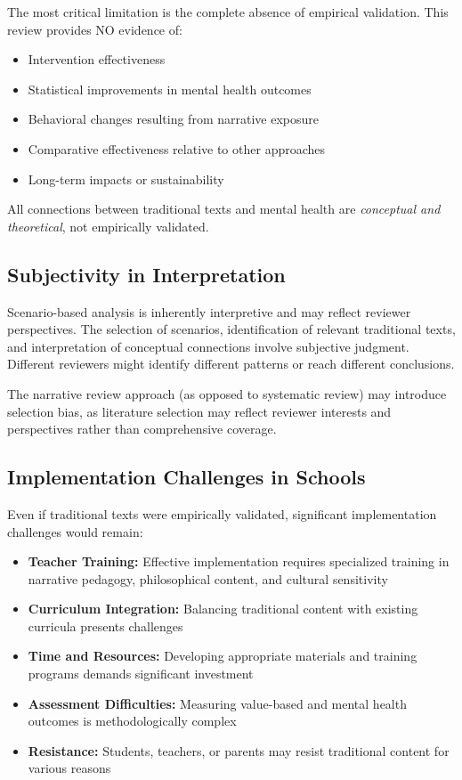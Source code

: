 \documentclass[12pt,a4paper,twocolumn]{article}
\begin{document}
The most critical limitation is the complete absence of empirical validation. This review provides NO evidence of:
\begin{itemize}
    \item Intervention effectiveness
    \item Statistical improvements in mental health outcomes
    \item Behavioral changes resulting from narrative exposure
    \item Comparative effectiveness relative to other approaches
    \item Long-term impacts or sustainability
\end{itemize}

All connections between traditional texts and mental health are \textit{conceptual and theoretical}, not empirically validated.

\subsection{Subjectivity in Interpretation}

Scenario-based analysis is inherently interpretive and may reflect reviewer perspectives. The selection of scenarios, identification of relevant traditional texts, and interpretation of conceptual connections involve subjective judgment. Different reviewers might identify different patterns or reach different conclusions.

The narrative review approach (as opposed to systematic review) may introduce selection bias, as literature selection may reflect reviewer interests and perspectives rather than comprehensive coverage.

\subsection{Implementation Challenges in Schools}

Even if traditional texts were empirically validated, significant implementation challenges would remain:

\begin{itemize}
    \item \textbf{Teacher Training:} Effective implementation requires specialized training in narrative pedagogy, philosophical content, and cultural sensitivity
    \item \textbf{Curriculum Integration:} Balancing traditional content with existing curricula presents challenges
    \item \textbf{Time and Resources:} Developing appropriate materials and training programs demands significant investment
    \item \textbf{Assessment Difficulties:} Measuring value-based and mental health outcomes is methodologically complex
    \item \textbf{Resistance:} Students, teachers, or parents may resist traditional content for various reasons
\end{itemize}
\end{document}
